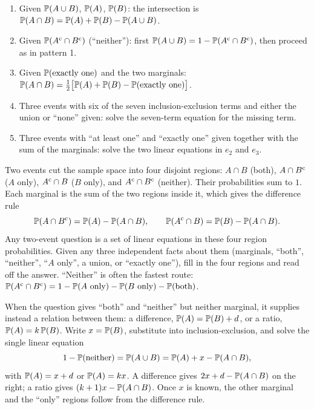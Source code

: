 \begin{enumerate}[leftmargin=2em]
  \item Given $\mathbb{P}(A \cup B)$, $\mathbb{P}(A)$, $\mathbb{P}(B)$: the intersection is
  $\mathbb{P}(A \cap B) = \mathbb{P}(A) + \mathbb{P}(B) - \mathbb{P}(A \cup B)$.
  \item Given $\mathbb{P}(A^{\mathrm{c}} \cap B^{\mathrm{c}})$ (``neither''): first $\mathbb{P}(A \cup B) = 1 - \mathbb{P}(A^{\mathrm{c}} \cap B^{\mathrm{c}})$,
  then proceed as in pattern 1.
  \item Given $\mathbb{P}(\text{exactly one})$ and the two marginals: $\mathbb{P}(A \cap B) =
  \tfrac12\bigl[\mathbb{P}(A) + \mathbb{P}(B) - \mathbb{P}(\text{exactly one})\bigr]$.
  \item Three events with six of the seven inclusion-exclusion terms and either the union or
  ``none'' given: solve the seven-term equation for the missing term.
  \item Three events with ``at least one'' and ``exactly one'' given together with the sum of the
  marginals: solve the two linear equations in $e_2$ and $e_3$.
\end{enumerate}

\begin{keyfact}
Two events cut the sample space into four disjoint regions: $A \cap B$ (both), $A \cap B^{\mathrm{c}}$
($A$ only), $A^{\mathrm{c}} \cap B$ ($B$ only), and $A^{\mathrm{c}} \cap B^{\mathrm{c}}$ (neither). Their probabilities sum
to $1$. Each marginal is the sum of the two regions inside it, which gives the difference rule
\[
\mathbb{P}(A \cap B^{\mathrm{c}}) = \mathbb{P}(A) - \mathbb{P}(A \cap B), \qquad
\mathbb{P}(A^{\mathrm{c}} \cap B) = \mathbb{P}(B) - \mathbb{P}(A \cap B).
\]
Any two-event question is a set of linear equations in these four region probabilities. Given any
three independent facts about them (marginals, ``both'', ``neither'', ``$A$ only'', a union, or
``exactly one''), fill in the four regions and read off the answer. ``Neither'' is often the
fastest route: $\mathbb{P}(A^{\mathrm{c}} \cap B^{\mathrm{c}}) = 1 - \mathbb{P}(A \text{ only}) - \mathbb{P}(B \text{ only}) - \mathbb{P}(\text{both})$.
\end{keyfact}

\begin{keyfact}
When the question gives ``both'' and ``neither'' but neither marginal, it supplies instead a
relation between them: a difference, $\mathbb{P}(A) = \mathbb{P}(B) + d$, or a ratio, $\mathbb{P}(A) = k\,\mathbb{P}(B)$.
Write $x = \mathbb{P}(B)$, substitute into inclusion-exclusion, and solve the single linear equation
\[
1 - \mathbb{P}(\text{neither}) = \mathbb{P}(A \cup B) = \mathbb{P}(A) + x - \mathbb{P}(A \cap B),
\]
with $\mathbb{P}(A) = x + d$ or $\mathbb{P}(A) = kx$. A difference gives $2x + d - \mathbb{P}(A \cap B)$ on the
right; a ratio gives $(k+1)x - \mathbb{P}(A \cap B)$. Once $x$ is known, the other marginal and the
``only'' regions follow from the difference rule.
\end{keyfact}

